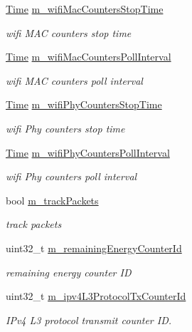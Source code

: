 \begin{DoxyCompactItemize}
\hyperlink{classns3_1_1Time}{Time} \hyperlink{classns3_1_1AnimationInterface_ac5b180c203a8bea7086218d6f248c413}{m\+\_\+wifi\+Mac\+Counters\+Stop\+Time}
\begin{DoxyCompactList}\small\item\em wifi M\+AC counters stop time \end{DoxyCompactList}\item 
\hyperlink{classns3_1_1Time}{Time} \hyperlink{classns3_1_1AnimationInterface_a0209340f1cdcae7a5883b3df88dbbe71}{m\+\_\+wifi\+Mac\+Counters\+Poll\+Interval}
\begin{DoxyCompactList}\small\item\em wifi M\+AC counters poll interval \end{DoxyCompactList}\item 
\hyperlink{classns3_1_1Time}{Time} \hyperlink{classns3_1_1AnimationInterface_ae660753e4c89f4254a29df047a5517ff}{m\+\_\+wifi\+Phy\+Counters\+Stop\+Time}
\begin{DoxyCompactList}\small\item\em wifi Phy counters stop time \end{DoxyCompactList}\item 
\hyperlink{classns3_1_1Time}{Time} \hyperlink{classns3_1_1AnimationInterface_a767c197f3c889081df0edace3025c8aa}{m\+\_\+wifi\+Phy\+Counters\+Poll\+Interval}
\begin{DoxyCompactList}\small\item\em wifi Phy counters poll interval \end{DoxyCompactList}\item 
bool \hyperlink{classns3_1_1AnimationInterface_a941564ffa2215ad2d7ef25cb36549368}{m\+\_\+track\+Packets}
\begin{DoxyCompactList}\small\item\em track packets \end{DoxyCompactList}\item 
uint32\+\_\+t \hyperlink{classns3_1_1AnimationInterface_ad5b3ee97e22015b057745c2f43000839}{m\+\_\+remaining\+Energy\+Counter\+Id}
\begin{DoxyCompactList}\small\item\em remaining energy counter ID \end{DoxyCompactList}\item 
uint32\+\_\+t \hyperlink{classns3_1_1AnimationInterface_a7d8f8efdeb1c2e56ea32badbb48ca68c}{m\+\_\+ipv4\+L3\+Protocol\+Tx\+Counter\+Id}
\begin{DoxyCompactList}\small\item\em I\+Pv4 L3 protocol transmit counter ID. \end{DoxyCompactList}\item 

\end{DoxyCompactItemize}
